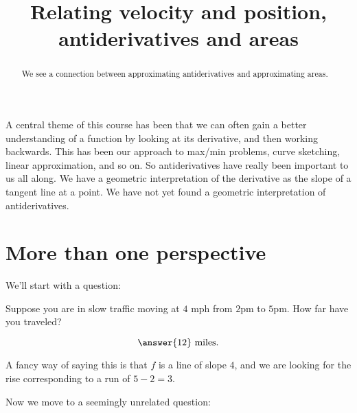 \documentclass{ximera}
\title[Dig-In:]{Relating velocity and position, antiderivatives and areas}
\begin{document}
\begin{abstract}
We see a connection between approximating antiderivatives and approximating areas. 
\end{abstract}
\maketitle

A central theme of this course has been that we can often gain a
better understanding of a function by looking at its derivative, and
then working backwards.  This has been our approach to max/min
problems, curve sketching, linear approximation, and so on.  So
antiderivatives have really been important to us all along. We have a
geometric interpretation of the derivative as the slope of a tangent
line at a point.  We have not yet found a geometric interpretation of
antiderivatives.


\section{More than one perspective}

We'll start with a question:

\begin{question}
   Suppose you are in slow traffic moving at $4$ \textrm{mph} from
   $2$pm to $5$pm.  How far have you traveled?
   \begin{prompt}
     \[
     \answer{12}\ \text{miles}.
     \]
   \end{prompt}
   \begin{hint}
    A fancy way of saying this is that $f$ is a line of slope $4$, and
    we are looking for the rise corresponding to a run of $5-2= 3$.
   \end{hint}
  \end{question}

Now we move to a seemingly unrelated question:
\end{document}
